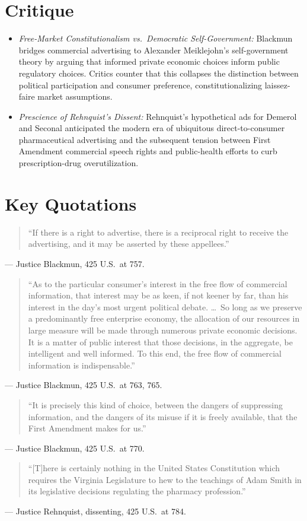 \documentclass[12pt]{article}
\begin{document}
\section{Critique}
\begin{itemize}
  \item \textit{Free-Market Constitutionalism vs.\ Democratic Self-Government:} Blackmun bridges commercial advertising to Alexander Meiklejohn's self-government theory by arguing that informed private economic choices inform public regulatory choices. Critics counter that this collapses the distinction between political participation and consumer preference, constitutionalizing laissez-faire market assumptions.
  \item \textit{Prescience of Rehnquist's Dissent:} Rehnquist's hypothetical ads for Demerol and Seconal anticipated the modern era of ubiquitous direct-to-consumer pharmaceutical advertising and the subsequent tension between First Amendment commercial speech rights and public-health efforts to curb prescription-drug overutilization.
\end{itemize}

\section{Key Quotations}
\begin{quote}
``If there is a right to advertise, there is a reciprocal right to receive the advertising, and it may be asserted by these appellees.''
\end{quote}
\noindent --- Justice Blackmun, 425 U.S.\ at 757.

\begin{quote}
``As to the particular consumer's interest in the free flow of commercial information, that interest may be as keen, if not keener by far, than his interest in the day's most urgent political debate. \dots\ So long as we preserve a predominantly free enterprise economy, the allocation of our resources in large measure will be made through numerous private economic decisions. It is a matter of public interest that those decisions, in the aggregate, be intelligent and well informed. To this end, the free flow of commercial information is indispensable.''
\end{quote}
\noindent --- Justice Blackmun, 425 U.S.\ at 763, 765.

\begin{quote}
``It is precisely this kind of choice, between the dangers of suppressing information, and the dangers of its misuse if it is freely available, that the First Amendment makes for us.''
\end{quote}
\noindent --- Justice Blackmun, 425 U.S.\ at 770.

\begin{quote}
``[T]here is certainly nothing in the United States Constitution which requires the Virginia Legislature to hew to the teachings of Adam Smith in its legislative decisions regulating the pharmacy profession.''
\end{quote}
\noindent --- Justice Rehnquist, dissenting, 425 U.S.\ at 784.
\end{document}
